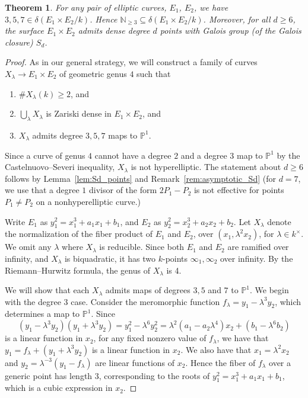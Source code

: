 \documentclass[a4paper,11pt]{amsart}
\theoremstyle{plain}
\newtheorem{thm}{Theorem}[section]
\theoremstyle{remark}
\renewcommand{\P}{\mathbb{P}}
\newcommand{\dendegs}{\delta}
\begin{document}
\begin{thm}\label{Ec:3,5,7}
    For any pair of elliptic curves, $E_1$, $E_2$, we have $3, 5, 7 \in \dendegs(E_1 \times E_2/k)$. 
    Hence $\mathbb{N}_{\geq 3}\subseteq \dendegs(E_1\times E_2/k)$.
    Moreover, for all \(d \geq 6\), the surface \(E_1 \times E_2\) admits dense degree \(d\) points with Galois group (of the Galois closure) \(S_d\).
\end{thm}
\begin{proof}
    As in our general strategy, we will construct a family of curves \(X_\lambda \to E_1 \times E_2\) of geometric genus \(4\) such that
    \begin{enumerate}
        \item \(\#X_\lambda(k) \geq 2\), and
        \item \(\bigcup_\lambda X_\lambda\) is Zariski dense in \(E_1 \times E_2\), and
        \item $X_\lambda$ admits degree $3, 5, 7$ maps to $\mathbb{P}^1$.
    \end{enumerate}
    Since a curve of genus \(4\) cannot have a degree \(2\) and a degree \(3\) map to \(\P^1\) by the Castelnuovo--Severi inequality, \(X_{\lambda}\) is not hyperelliptic. The statement about \(d \geq 6\) follows by Lemma~\ref{lem:Sd_points} and Remark~\ref{rem:asymptotic_Sd} (for \(d =7\), we use that a degree \(1\) divisor of the form \(2P_1 - P_2\) is not effective for points \(P_1 \neq P_2\) on a nonhyperelliptic curve.)

    Write $E_1$ as $y_1^2 = x_1^3 + a_1 x_1 + b_1$, and $E_2$ as $y_2^2 = x_2^3 + a_2 x_2 + b_2$. Let $X_{\lambda}$ denote the normalization of the fiber product of $E_1$ and $E_2$, over $(x_1, \lambda^2 x_2)$, for $\lambda \in k^{\times}$. We omit any $\lambda$ where $X_{\lambda}$ is reducible. Since both $E_1$ and $E_2$ are ramified over infinity, and $X_{\lambda}$ is biquadratic, it has two \(k\)-points \(\infty_1, \infty_2\) over infinity. By the Riemann--Hurwitz formula, the genus of \(X_\lambda\) is 4.

    We will show that each \(X_\lambda\) admits maps of degrees \(3, 5\) and \(7\) to \(\P^1\).  We begin with the degree \(3\) case.  Consider the meromorphic function $f_{\lambda} = y_1 - \lambda^3 y_2$, which determines a map to \(\P^1\). 
    Since 
    \begin{equation}\label{eq:diff_sqs}
        (y_1 - \lambda^3 y_2)(y_1 + \lambda^3 y_2) = y_1^2 - \lambda^6 y_2^2 = \lambda^2 (a_1 - a_2\lambda^4)x_2 + (b_1 - \lambda^6 b_2)
    \end{equation}
    is a linear function in \(x_2\), for any fixed nonzero value of \(f_\lambda\), we have that
    \(y_1 = f_\lambda + (y_1 + \lambda^3y_2)\) is a linear function in \(x_2\).  We also have that \(x_1 = \lambda^2x_2\) and \(y_2 = \lambda^{-3}(y_1- f_\lambda )\) are linear functions of \(x_2\).  Hence the fiber of \(f_\lambda\) over a generic point has length \(3\), corresponding to the roots of \(y_1^2 = x_1^3 + a_1 x_1 + b_1\), which is a cubic expression in \(x_2\).


\end{proof}
\end{document}
